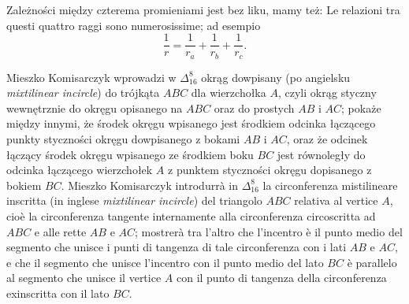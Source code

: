 Zależności między czterema promieniami jest bez liku, mamy też: %
Le relazioni tra questi quattro raggi sono numerosissime; ad esempio %
\begin{equation}
	\frac{1}{r} = \frac {1} {r_a} + \frac {1} {r_b} + \frac {1} {r_c}.
\end{equation}

Mieszko Komisarczyk wprowadzi w $\Delta_{16}^{8}$ okrąg dowpisany (po angielsku \emph{mixtilinear incircle}) do trójkąta $ABC$ dla wierzchołka $A$, czyli okrąg styczny wewnętrznie do okręgu opisanego na $ABC$ oraz do prostych $AB$ i $AC$; pokaże między innymi, że środek okręgu wpisanego jest środkiem odcinka łączącego punkty styczności okręgu dowpisanego z bokami $AB$ i $AC$, oraz że odcinek łączący środek okręgu wpisanego ze środkiem boku $BC$ jest równoległy do odcinka łączącego wierzchołek $A$ z punktem styczności okręgu dopisanego z bokiem $BC$. %
Mieszko Komisarczyk introdurrà in $\Delta_{16}^{8}$ la circonferenza mistilineare inscritta (in inglese \emph{mixtilinear incircle}) del triangolo $ABC$ relativa al vertice $A$, cioè la circonferenza tangente internamente alla circonferenza circoscritta ad $ABC$ e alle rette $AB$ e $AC$; mostrerà tra l'altro che l'incentro è il punto medio del segmento che unisce i punti di tangenza di tale circonferenza con i lati $AB$ e $AC$, e che il segmento che unisce l'incentro con il punto medio del lato $BC$ è parallelo al segmento che unisce il vertice $A$ con il punto di tangenza della circonferenza exinscritta con il lato $BC$. %

